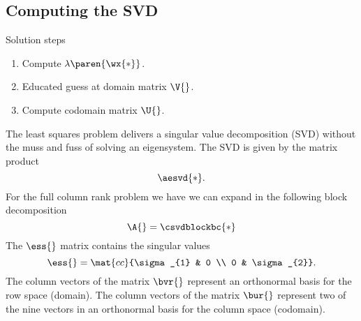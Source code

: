 \subsection{Computing the SVD}  %
Solution steps
\begin{enumerate}
  \item Compute $\lambda\paren{\wx{*}}$.
  \item Educated guess at domain matrix $\V{}$.
  \item Compute codomain matrix $\U{}$.
\end{enumerate}
The least squares problem delivers a singular value decomposition (SVD) without the muss and fuss of solving an eigensystem. The SVD is given by the matrix product
  \begin{equation*}
    \aesvd{*}.
  \end{equation*}
For the full column rank problem we have we can expand in the following block decomposition
  \begin{equation*}
    \A{} = \csvdblockbc{*}
  \end{equation*}
The $\ess{}$ matrix contains the singular values
  \begin{equation*}
    \ess{} = \mat{cc}{\sigma_{1} & 0 \\ 0 & \sigma_{2}}.
  \end{equation*}
The column vectors of the matrix $\bvr{}$ represent an orthonormal basis for the row space (domain). The column vectors of the matrix $\bur{}$ represent two of the nine vectors in an orthonormal basis for the column space (codomain).

